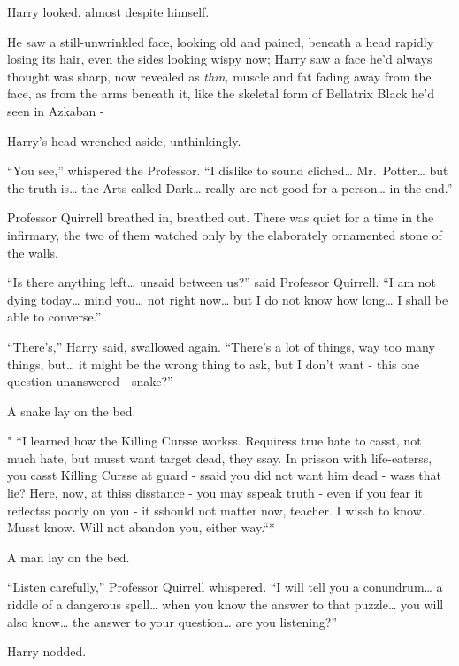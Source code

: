 Harry looked, almost despite himself.

He saw a still-unwrinkled face, looking old and pained, beneath a head
rapidly losing its hair, even the sides looking wispy now; Harry saw a
face he'd always thought was sharp, now revealed as \emph{thin,} muscle
and fat fading away from the face, as from the arms beneath it, like the
skeletal form of Bellatrix Black he'd seen in Azkaban -

Harry's head wrenched aside, unthinkingly.

``You see,'' whispered the Professor. ``I dislike to sound
cliched\ldots{} Mr.~Potter\ldots{} but the truth is\ldots{} the Arts
called Dark\ldots{} really are not good for a person\ldots{} in the
end.''

Professor Quirrell breathed in, breathed out. There was quiet for a time
in the infirmary, the two of them watched only by the elaborately
ornamented stone of the walls.

``Is there anything left\ldots{} unsaid between us?'' said Professor
Quirrell. ``I am not dying today\ldots{} mind you\ldots{} not right
now\ldots{} but I do not know how long\ldots{} I shall be able to
converse.''

``There's,'' Harry said, swallowed again. ``There's a lot of things, way
too many things, but\ldots{} it might be the wrong thing to ask, but I
don't want - this one question unanswered - snake?''

A snake lay on the bed.

" *I learned how the Killing Cursse workss. Requiress true hate to
casst, not much hate, but musst want target dead, they ssay. In prisson
with life-eaterss, you casst Killing Cursse at guard - ssaid you did not
want him dead - wass that lie? Here, now, at thiss disstance - you may
sspeak truth - even if you fear it reflectss poorly on you - it sshould
not matter now, teacher. I wissh to know. Musst know. Will not abandon
you, either way.``*

A man lay on the bed.

``Listen carefully,'' Professor Quirrell whispered. ``I will tell you a
conundrum\ldots{} a riddle of a dangerous spell\ldots{} when you know
the answer to that puzzle\ldots{} you will also know\ldots{} the answer
to your question\ldots{} are you listening?''

Harry nodded.

